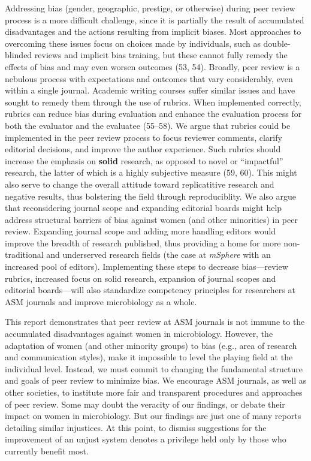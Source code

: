 \documentclass[11pt,]{article}
\begin{document}
Addressing bias (gender, geographic, prestige, or otherwise) during peer
review process is a more difficult challenge, since it is partially the
result of accumulated disadvantages and the actions resulting from
implicit biases. Most approaches to overcoming these issues focus on
choices made by individuals, such as double-blinded reviews and implicit
bias training, but these cannot fully remedy the effects of bias and may
even worsen outcomes (53, 54). Broadly, peer review is a nebulous
process with expectations and outcomes that vary considerably, even
within a single journal. Academic writing courses suffer similar issues
and have sought to remedy them through the use of rubrics. When
implemented correctly, rubrics can reduce bias during evaluation and
enhance the evaluation process for both the evaluator and the evaluatee
(55--58). We argue that rubrics could be implemented in the peer review
process to focus reviewer comments, clarify editorial decisions, and
improve the author experience. Such rubrics should increase the emphasis
on \textbf{solid} research, as opposed to novel or ``impactful''
research, the latter of which is a highly subjective measure (59, 60).
This might also serve to change the overall attitude toward
replicatitive research and negative results, thus bolstering the field
through reproduciblity. We also argue that reconsidering journal scope
and expanding editorial boards might help address structural barriers of
bias against women (and other minorities) in peer review. Expanding
journal scope and adding more handling editors would improve the breadth
of research published, thus providing a home for more non-traditional
and underserved research fields (the case at \emph{mSphere} with an
increased pool of editors). Implementing these steps to decrease
bias---review rubrics, increased focus on solid research, expansion of
journal scopes and editorial boards---will also standardize competency
principles for researchers at ASM journals and improve microbiology as a
whole.

This report demonstrates that peer review at ASM journals is not immune
to the accumulated disadvantages against women in microbiology. However,
the adaptation of women (and other minority groups) to bias (e.g., area
of research and communication styles), make it impossible to level the
playing field at the individual level. Instead, we must commit to
changing the fundamental structure and goals of peer review to minimize
bias. We encourage ASM journals, as well as other societies, to
institute more fair and transparent procedures and approaches of peer
review. Some may doubt the veracity of our findings, or debate their
impact on women in microbiology. But our findings are just one of many
reports detailing similar injustices. At this point, to dismiss
suggestions for the improvement of an unjust system denotes a privilege
held only by those who currently benefit most.
\end{document}
